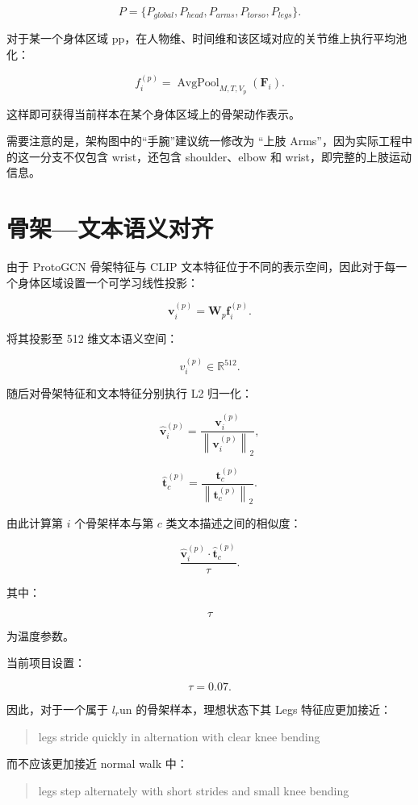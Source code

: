 \[
P=
\{
P_{global},
P_{head},
P_{arms},
P_{torso},
P_{legs}
\}.
\]

对于某一个身体区域 pp，在人物维、时间维和该区域对应的关节维上执行平均池化：

\[
f_i^{(p)}
=
\operatorname{AvgPool}_{M,T,V_p}
(
\mathbf F_i
).
\]

这样即可获得当前样本在某个身体区域上的骨架动作表示。

需要注意的是，架构图中的“手腕”建议统一修改为 “上肢 Arms”，因为实际工程中的这一分支不仅包含 wrist，还包含 shoulder、elbow 和 wrist，即完整的上肢运动信息。


\section{骨架—文本语义对齐}

由于 ProtoGCN 骨架特征与 CLIP 文本特征位于不同的表示空间，因此对于每一个身体区域设置一个可学习线性投影：

\[
\mathbf v_i^{(p)}
=
\mathbf W_p
\mathbf f_i^{(p)}.
\]

将其投影至 512 维文本语义空间：

\[
v_i^{(p)}
\in
\mathbb R^{512}.
\]

随后对骨架特征和文本特征分别执行 L2 归一化：

\[
\hat{\mathbf v}_i^{(p)}
=
\frac{
\mathbf v_i^{(p)}
}{
\left\|
\mathbf v_i^{(p)}
\right\|_2
},
\]

\[
\hat{\mathbf t}_c^{(p)}
=
\frac{
\mathbf t_c^{(p)}
}{
\left\|
\mathbf t_c^{(p)}
\right\|_2
}.
\]

由此计算第 \(i\) 个骨架样本与第 \(c\) 类文本描述之间的相似度：

\[
\frac{
\hat{\mathbf v}_i^{(p)}
\cdot
\hat{\mathbf t}_c^{(p)}
}{
\tau
}.
\]

其中：

\[
\tau
\]

为温度参数。

当前项目设置：

\[
\tau=0.07.
\]

因此，对于一个属于 \(l_r\)un 的骨架样本，理想状态下其 Legs 特征应更加接近：

\begin{quote}
legs stride quickly in alternation with clear knee bending

\end{quote}

而不应该更加接近 normal walk 中：

\begin{quote}
legs step alternately with short strides and small knee bending

\end{quote}

